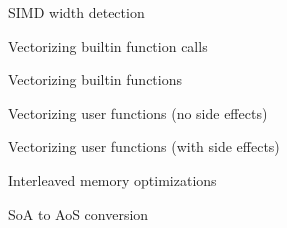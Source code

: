 
\begin{frame}{SIMD width detection}

\end{frame}


\begin{frame}{Vectorizing builtin function calls}


\end{frame}


\begin{frame}{Vectorizing builtin functions}


\end{frame}


\begin{frame}{Vectorizing user functions (no side effects)}


\end{frame}


\begin{frame}{Vectorizing user functions (with side effects)}


\end{frame}


\begin{frame}{Interleaved memory optimizations}

\end{frame}


\begin{frame}{SoA to AoS conversion}

\end{frame}

